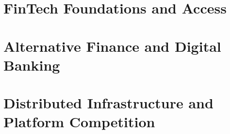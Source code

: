 \documentclass[11pt,oneside,a4paper]{report}
\begin{document}
\cleardoublepage
{}
\setcounter{tocdepth}{0}
\begingroup
\small
\setlength{\parskip}{0pt}
\tableofcontents
\endgroup
\newpage
\hypersetup{pageanchor=true}



\cleardoublepage
{}

\part{FinTech Foundations and Access}



\part{Alternative Finance and Digital Banking}




\part{Distributed Infrastructure and Platform Competition}





\end{document}
